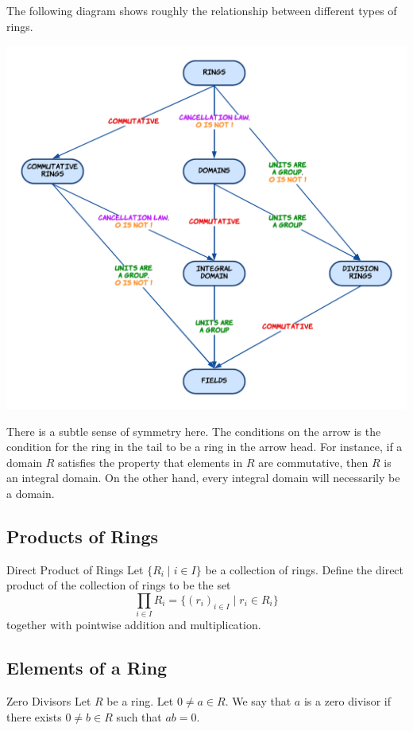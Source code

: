 \documentclass[a4paper]{article}
\begin{document}
The following diagram shows roughly the relationship between different types of rings. 

\begin{center}
\includegraphics[scale = 0.3]{Ring Diagram}
\end{center}

There is a subtle sense of symmetry here. The conditions on the arrow is the condition for the ring in the tail to be a ring in the arrow head. For instance, if a domain $R$ satisfies the property that elements in $R$ are commutative, then $R$ is an integral domain. On the other hand, every integral domain will necessarily be a domain. 

\subsection{Products of Rings}
\begin{defn}{Direct Product of Rings}{} Let $\{R_i\;|\;i\in I\}$ be a collection of rings. Define the direct product of the collection of rings to be the set $$\prod_{i\in I}R_i=\{(r_i)_{i\in I}\;|\;r_i\in R_i\}$$ together with pointwise addition and multiplication. 
\end{defn}

\subsection{Elements of a Ring}
\begin{defn}{Zero Divisors}{} Let $R$ be a ring. Let $0\neq a\in R$. We say that $a$ is a zero divisor if there exists $0\neq b\in R$ such that $ab=0$. 
\end{defn}
\end{document}
